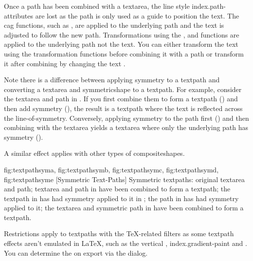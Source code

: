 Once a \gls{path} has been combined with a \gls{textarea}, the line
style \glspl{index.path-attribute} are lost as the path is only used
as a guide to position the text. The \gls{cag} functions, such as
, are applied to the underlying path and the text
is adjusted to follow the new path.  Transformations using the
,  and 
functions are applied to the underlying path not the text. You can
either transform the text using the transformation functions before
combining it with a path or transform it after combining by changing
the text .

Note there is a difference between applying \gls{symmetry} to a
\gls{textpath} and converting a \gls*{textarea} and
\gls{symmetricshape} to a \gls*{textpath}. For example, consider the
\gls{textarea} and \gls{path} in . If
you first combine them to form a \gls*{textpath}
() and then add symmetry
(), the result is a \gls*{textpath}
where the text is reflected across the \gls{line-of-symmetry}.
Conversely, applying \gls{symmetry} to the path first
() and then combining with the
\gls*{textarea} yields a \gls*{textarea} where only the underlying
path has \gls{symmetry} ().

A similar effect applies with other types of \glspl{compositeshape}.

{%
 {fig:textpathsyma}{}{},
 {fig:textpathsymb}{}{},
 {fig:textpathsymc}{}{},
 {fig:textpathsymd}{}{},
 {fig:textpathsyme}{}{}
}
[Symmetric Text-Paths]
{Symmetric \glspl{textpath}:
 original \gls{textarea} and \gls{path};
 \gls{textarea} and \gls{path} in 
 have been combined to
form a \gls{textpath};
 the \gls{textpath} in  
has had \gls{symmetry} applied to it in \editpathmode; 
 the \gls{path} in
 has had \gls{symmetry} applied to it;
 the \gls{textarea} and symmetric path in 
 have been combined to form a
\gls{textpath}.}

\begin{warning}
Restrictions apply to \glspl*{textpath} with the
 \TeX-related filters as some \gls*{textpath}
effects aren't emulated in \LaTeX, such as the vertical ,
\gls{index.gradient-paint} and . You can determine 
the  on export via the  dialog.
\end{warning}


